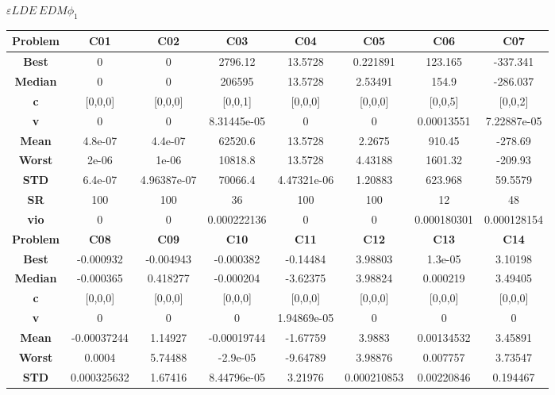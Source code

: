 \documentclass{IEEEtran}
\begin{document}
\begin{center}
$\varepsilon LDE\ EDM \phi_1$\\
  \begin{tabular}{|c|c|c|c|c|c|c|c|}
    \hline 
    \textbf{Problem} & \textbf{C01} & \textbf{C02} & \textbf{C03} & \textbf{C04} & \textbf{C05} & \textbf{C06} & \textbf{C07} \\ 
    \hline\hline 
    \textbf{Best} & 0 & 0 & 2796.12 & 13.5728 & 0.221891 & 123.165 & -337.341\\ 
    \textbf{Median} & 0 & 0 & 206595 & 13.5728 & 2.53491 & 154.9 & -286.037\\ 
    \textbf{c} & [0,0,0] & [0,0,0] & [0,0,1] & [0,0,0] & [0,0,0] & [0,0,5] & [0,0,2]\\ 
    \textbf{v} & 0 & 0 & 8.31445e-05 & 0 & 0 & 0.00013551 & 7.22887e-05\\ 
    \textbf{Mean} & 4.8e-07 & 4.4e-07 & 62520.6 & 13.5728 & 2.2675 & 910.45 & -278.69\\ 
    \textbf{Worst} & 2e-06 & 1e-06 & 10818.8 & 13.5728 & 4.43188 & 1601.32 & -209.93\\ 
    \textbf{STD} & 6.4e-07 & 4.96387e-07 & 70066.4 & 4.47321e-06 & 1.20883 & 623.968 & 59.5579\\ 
    \textbf{SR} & 100 & 100 & 36 & 100 & 100 & 12 & 48\\ 
    \textbf{vio} & 0 & 0 & 0.000222136 & 0 & 0 & 0.000180301 & 0.000128154\\ 
    \hline 
    \hline 
    \textbf{Problem} & \textbf{C08} & \textbf{C09} & \textbf{C10} & \textbf{C11} & \textbf{C12} & \textbf{C13} & \textbf{C14} \\ 
    \hline\hline 
    \textbf{Best} & -0.000932 & -0.004943 & -0.000382 & -0.14484 & 3.98803 & 1.3e-05 & 3.10198\\ 
    \textbf{Median} & -0.000365 & 0.418277 & -0.000204 & -3.62375 & 3.98824 & 0.000219 & 3.49405\\ 
    \textbf{c} & [0,0,0] & [0,0,0] & [0,0,0] & [0,0,0] & [0,0,0] & [0,0,0] & [0,0,0]\\ 
    \textbf{v} & 0 & 0 & 0 & 1.94869e-05 & 0 & 0 & 0\\ 
    \textbf{Mean} & -0.00037244 & 1.14927 & -0.00019744 & -1.67759 & 3.9883 & 0.00134532 & 3.45891\\ 
    \textbf{Worst} & 0.0004 & 5.74488 & -2.9e-05 & -9.64789 & 3.98876 & 0.007757 & 3.73547\\ 
    \textbf{STD} & 0.000325632 & 1.67416 & 8.44796e-05 & 3.21976 & 0.000210853 & 0.00220846 & 0.194467\\ 

\end{tabular}
\end{center}
\end{document}
